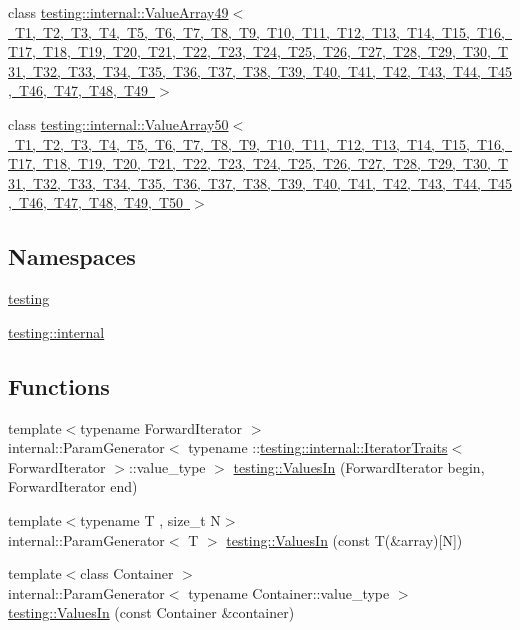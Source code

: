 \begin{DoxyCompactItemize}
\item 
class \mbox{\hyperlink{classtesting_1_1internal_1_1_value_array49}{testing\+::internal\+::\+Value\+Array49$<$ T1, T2, T3, T4, T5, T6, T7, T8, T9, T10, T11, T12, T13, T14, T15, T16, T17, T18, T19, T20, T21, T22, T23, T24, T25, T26, T27, T28, T29, T30, T31, T32, T33, T34, T35, T36, T37, T38, T39, T40, T41, T42, T43, T44, T45, T46, T47, T48, T49 $>$}}
\item 
class \mbox{\hyperlink{classtesting_1_1internal_1_1_value_array50}{testing\+::internal\+::\+Value\+Array50$<$ T1, T2, T3, T4, T5, T6, T7, T8, T9, T10, T11, T12, T13, T14, T15, T16, T17, T18, T19, T20, T21, T22, T23, T24, T25, T26, T27, T28, T29, T30, T31, T32, T33, T34, T35, T36, T37, T38, T39, T40, T41, T42, T43, T44, T45, T46, T47, T48, T49, T50 $>$}}
\end{DoxyCompactItemize}
\subsection*{Namespaces}
\begin{DoxyCompactItemize}
\item 
 \mbox{\hyperlink{namespacetesting}{testing}}
\item 
 \mbox{\hyperlink{namespacetesting_1_1internal}{testing\+::internal}}
\end{DoxyCompactItemize}
\subsection*{Functions}
\begin{DoxyCompactItemize}
\item 
{\footnotesize template$<$typename Forward\+Iterator $>$ }\\internal\+::\+Param\+Generator$<$ typename \+::\mbox{\hyperlink{structtesting_1_1internal_1_1_iterator_traits}{testing\+::internal\+::\+Iterator\+Traits}}$<$ Forward\+Iterator $>$\+::value\+\_\+type $>$ \mbox{\hyperlink{namespacetesting_a96240380ae4d3b4855d07de3b84fb336}{testing\+::\+Values\+In}} (Forward\+Iterator begin, Forward\+Iterator end)
\item 
{\footnotesize template$<$typename T , size\+\_\+t N$>$ }\\internal\+::\+Param\+Generator$<$ T $>$ \mbox{\hyperlink{namespacetesting_affa90ba3821bd7ac15f147b1c31f9a73}{testing\+::\+Values\+In}} (const T(\&array)\mbox{[}N\mbox{]})
\item 
{\footnotesize template$<$class Container $>$ }\\internal\+::\+Param\+Generator$<$ typename Container\+::value\+\_\+type $>$ \mbox{\hyperlink{namespacetesting_aa67d0c8470c5f69fcfcacc9e775fa982}{testing\+::\+Values\+In}} (const Container \&container)
\end{DoxyCompactItemize}
